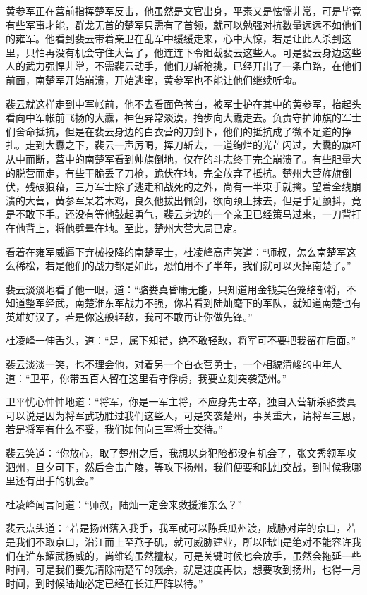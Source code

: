 黄参军正在营前指挥楚军反击，他虽然是文官出身，平素又是怯懦非常，可是毕竟有些军事才能，群龙无首的楚军只需有了首领，就可以勉强对抗数量远远不如他们的雍军。他看到裴云带着亲卫在乱军中缓缓走来，心中大惊，若是让此人杀到这里，只怕再没有机会守住大营了，他连连下令阻截裴云这些人。可是裴云身边这些人的武力强悍非常，不需裴云动手，他们刀斩枪挑，已经开出了一条血路，在他们前面，南楚军开始崩溃，开始逃窜，黄参军也不能让他们继续听命。

裴云就这样走到中军帐前，他不去看面色苍白，被军士护在其中的黄参军，抬起头看向中军帐前飞扬的大纛，神色异常淡漠，抬步向大纛走去。负责守护帅旗的军士们舍命抵抗，但是在裴云身边的白衣营的刀剑下，他们的抵抗成了微不足道的挣扎。走到大纛之下，裴云一声厉喝，挥刀斩去，一道绚烂的光芒闪过，大纛的旗杆从中而断，营中的南楚军看到帅旗倒地，仅存的斗志终于完全崩溃了。有些胆量大的脱营而走，有些干脆丢了刀枪，跪伏在地，完全放弃了抵抗。楚州大营旌旗倒伏，残破狼藉，三万军士除了逃走和战死的之外，尚有一半束手就擒。望着全线崩溃的大营，黄参军呆若木鸡，良久他拔出佩剑，欲向颈上抹去，但是手足颤抖，竟是不敢下手。还没有等他鼓起勇气，裴云身边的一个亲卫已经策马过来，一刀背打在他背上，将他劈晕在地。至此，楚州大营大局已定。

看着在雍军威逼下弃械投降的南楚军士，杜凌峰高声笑道：“师叔，怎么南楚军这么稀松，若是他们的战力都是如此，恐怕用不了半年，我们就可以灭掉南楚了。”

裴云淡淡地看了他一眼，道：“骆娄真昏庸无能，只知道用金钱美色笼络部将，不知道整军经武，南楚淮东军战力不强，你若看到陆灿麾下的军队，就知道南楚也有英雄好汉了，若是你这般轻敌，我可不敢再让你做先锋。”

杜凌峰一伸舌头，道：“是，属下知错，绝不敢轻敌，将军可不要把我留在后面。”

裴云淡淡一笑，也不理会他，对着另一个白衣营勇士，一个相貌清峻的中年人道：“卫平，你带五百人留在这里看守俘虏，我要立刻突袭楚州。”

卫平忧心忡忡地道：“将军，你是一军主将，不应身先士卒，独自入营斩杀骆娄真可以说是因为将军武功胜过我们这些人，可是突袭楚州，事关重大，请将军三思，若是将军有什么不妥，我们如何向三军将士交待。”

裴云笑道：“你放心，取了楚州之后，我想以身犯险都没有机会了，张文秀领军攻泗州，旦夕可下，然后合击广陵，等攻下扬州，我们便要和陆灿交战，到时候我哪里还有出手的机会。”

杜凌峰闻言问道：“师叔，陆灿一定会来救援淮东么？”

裴云点头道：“若是扬州落入我手，我军就可以陈兵瓜州渡，威胁对岸的京口，若是我们不取京口，沿江而上至燕子矶，就可威胁建业，所以陆灿是绝对不能容许我们在淮东耀武扬威的，尚维钧虽然擅权，可是关键时候也会放手，虽然会拖延一些时间，可是我们要先清除南楚军的残余，就是速度再快，想要攻到扬州，也得一月时间，到时候陆灿必定已经在长江严阵以待。”

